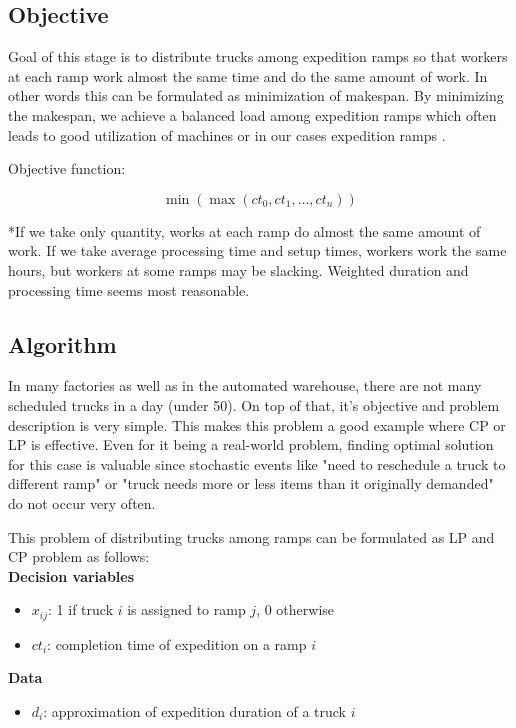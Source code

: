 \documentclass{ctuthesis}
\begin{document}
\subsection{Objective}

Goal of this stage is to distribute trucks among expedition ramps so that workers at each ramp work almost the same time and do the same amount of work. In other words this can be formulated as minimization of makespan. By minimizing the makespan, we achieve a balanced load among expedition ramps which often leads to good utilization of machines or in our cases expedition ramps \cite{pinedo}. 

 Objective function:
 
 \begin{equation}
     \min(\max(ct_0, ct_1, \ldots, ct_n))
 \end{equation}
 
 *If we take only quantity, works at each ramp do almost the same amount of work. If we take average processing time and setup times, workers work the same hours, but workers at some ramps may be slacking. Weighted duration and processing time seems most reasonable.

\subsection{Algorithm}

In many factories as well as in the automated warehouse, there are not many scheduled trucks in a day (under 50). On top of that, it's objective and problem description is very simple. This makes this problem a good example where CP or LP is effective. Even for it being a real-world problem, finding optimal solution for this case is valuable since stochastic events like "need to reschedule a truck to different ramp" or "truck needs more or less items than it originally demanded" do not occur very often.

This problem of distributing trucks among ramps can be formulated as LP and CP problem as follows:\\

\noindent \textbf{Decision variables}

\begin{itemize}
\item $x_{ij}$: 1 if truck $i$ is assigned to ramp $j$, 0 otherwise
\item$ct_i$: completion time of expedition on a ramp $i$
\end{itemize}
\textbf{Data}
\begin{itemize}
\item$d_i$: approximation of expedition duration of a truck $i$
\end{itemize}
\end{document}
